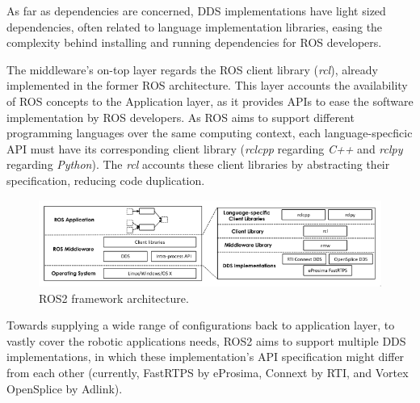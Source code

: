 As far as dependencies are concerned, DDS implementations have light sized dependencies, often related to language implementation libraries, easing the complexity behind installing and running dependencies for ROS developers. \cite{ros-on-dds}

The middleware's on-top layer regards the ROS client library (\textit{rcl}), already implemented in the former ROS architecture. This layer accounts the availability of ROS concepts to the Application layer, as it provides APIs to ease the software implementation by ROS developers. \cite{ros2documentation} As ROS aims to support different programming languages over the same computing context, each language-specficic API must have its corresponding client library (\textit{rclcpp} regarding \textit{C++} and \textit{rclpy} regarding \textit{Python}). The \textit{rcl} accounts these client libraries by abstracting their specification, reducing code duplication.   
\cite{rcl, casini2019response}


\begin{figure}[H]
    \centering
    \includegraphics[width=\linewidth]{images/ros2-architecture.png}
    \caption{ROS2 framework architecture.}
    \label{fig:ros2-architecture}
\end{figure}

Towards supplying a wide range of configurations back to application layer, to vastly cover the robotic applications needs, ROS2 aims to support multiple DDS implementations, in which these implementation's API specification might differ from each other (currently, FastRTPS by eProsima, Connext by RTI, and Vortex OpenSplice by Adlink). 

